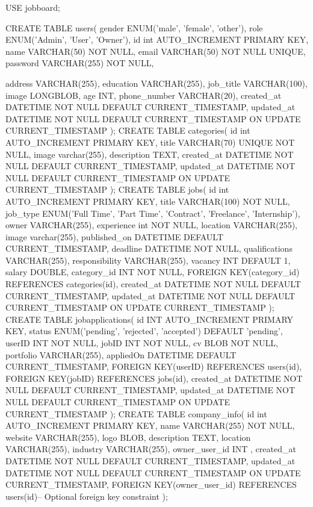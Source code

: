 USE jobboard;

CREATE TABLE users(
    gender ENUM('male', 'female', 'other'),
    role ENUM('Admin', 'User', 'Owner'),
    id int AUTO_INCREMENT PRIMARY KEY,
    name VARCHAR(50) NOT NULL,
    email VARCHAR(50) NOT NULL UNIQUE,
    password VARCHAR(255) NOT NULL,
   
    address VARCHAR(255),
    education VARCHAR(255),
    job_title VARCHAR(100),
    image LONGBLOB,
    age INT,
    phone_number VARCHAR(20),
    created_at DATETIME NOT NULL DEFAULT CURRENT_TIMESTAMP,
    updated_at DATETIME NOT NULL DEFAULT CURRENT_TIMESTAMP ON UPDATE CURRENT_TIMESTAMP
);
CREATE TABLE categories(
    id int AUTO_INCREMENT PRIMARY KEY,
    title VARCHAR(70) UNIQUE NOT NULL,
    image varchar(255),
    description TEXT,
    created_at DATETIME NOT NULL DEFAULT CURRENT_TIMESTAMP,
    updated_at DATETIME NOT NULL DEFAULT CURRENT_TIMESTAMP ON UPDATE CURRENT_TIMESTAMP
);
CREATE TABLE jobs(
    id int AUTO_INCREMENT PRIMARY KEY,
    title VARCHAR(100) NOT NULL,
    job_type ENUM('Full Time', 'Part Time', 'Contract', 'Freelance', 'Internship'),
    owner VARCHAR(255),
    experience int NOT NULL,
    location VARCHAR(255),
    image varchar(255),
    published_on DATETIME DEFAULT CURRENT_TIMESTAMP,
    deadline DATETIME NOT NULL,
    qualifications VARCHAR(255),
    responsibility VARCHAR(255),
    vacancy INT DEFAULT 1, salary DOUBLE,
    category_id INT NOT NULL,
    FOREIGN KEY(category_id) REFERENCES categories(id),
    created_at DATETIME NOT NULL DEFAULT CURRENT_TIMESTAMP,
    updated_at DATETIME NOT NULL DEFAULT CURRENT_TIMESTAMP ON UPDATE CURRENT_TIMESTAMP
);
CREATE TABLE jobapplications(
        id INT AUTO_INCREMENT PRIMARY KEY,
        status ENUM('pending', 'rejected', 'accepted') DEFAULT 'pending',
        userID INT NOT NULL,
        jobID INT NOT NULL,
        cv BLOB NOT NULL,
        portfolio VARCHAR(255),
        appliedOn DATETIME DEFAULT CURRENT_TIMESTAMP,
        FOREIGN KEY(userID) REFERENCES users(id),
        FOREIGN KEY(jobID) REFERENCES jobs(id),
        created_at DATETIME NOT NULL DEFAULT CURRENT_TIMESTAMP,
        updated_at DATETIME NOT NULL DEFAULT CURRENT_TIMESTAMP ON UPDATE CURRENT_TIMESTAMP
);
CREATE TABLE company_info(
        id int AUTO_INCREMENT PRIMARY KEY,
        name VARCHAR(255) NOT NULL,
        website VARCHAR(255),
        logo BLOB,
        description TEXT,
        location VARCHAR(255),
        industry VARCHAR(255),
        owner_user_id INT ,
        created_at DATETIME NOT NULL DEFAULT CURRENT_TIMESTAMP,
        updated_at DATETIME NOT NULL DEFAULT CURRENT_TIMESTAMP ON UPDATE CURRENT_TIMESTAMP,
        FOREIGN KEY(owner_user_id) REFERENCES users(id)-- Optional foreign key constraint
);
